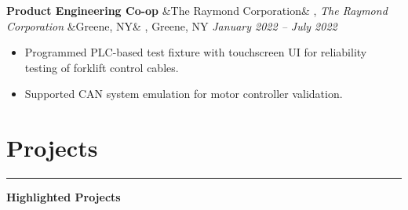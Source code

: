 \documentclass[letterpaper,10pt]{article}
\newcommand{\heading}[1]{%
    \vspace{-5mm} %
    \section*{#1}%
    \vspace{-3mm}%
    \noindent\hrule height 0.5pt %
    \vspace{4mm}%
}
\newcommand{\experience}[5]{%
    \noindent\textbf{#1}%
    \ifx&#2&
    \else
        , \textit{#2}%
    \fi
    \ifx&#3&
    \else
        , #3%
    \fi
    \hfill \textit{#4} \\
    \vspace{-6.8mm}%
    \begin{itemize}[itemsep=-5pt]
        \setlength{\itemindent}{0em}
        #5
    \end{itemize}
    \vspace{1mm}
}
\begin{document}
\experience
    {Product Engineering Co-op}
    {The Raymond Corporation}
    {Greene, NY}
    {January 2022 – July 2022}
    {
        \item Programmed PLC-based test fixture with touchscreen UI for reliability testing of forklift control cables.
        
        \item Supported CAN system emulation for motor controller validation.


    }

        

    


\vspace{-0.5em}
\heading{Projects}
{\Large \noindent\textbf{Highlighted Projects}} \\

    
\end{document}
